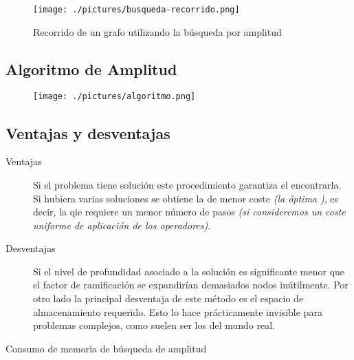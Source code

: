 \documentclass[letterpaper,12pt]{article}
\begin{document}
  	\begin{figure}[!hbt]
  		\centering
  	  	\texttt{[image: ./pictures/busqueda-recorrido.png]}
	  	\caption{Recorrido de un grafo utilizando la b\'usqueda por amplitud}
	  	\label{tipo:busqueda}
		\end{figure}
	
	
	\subsection{Algoritmo de Amplitud }
	
  	\begin{figure}[!hbt]
  		\centering
  	  	\texttt{[image: ./pictures/algoritmo.png]}
		\end{figure}

	

	\subsection{ Ventajas y desventajas }	
	
	\begin{description}
		\item[Ventajas] Si el problema tiene soluci\'on este procedimiento garantiza el encontrarla. Si hubiera varias soluciones se obtiene la de menor coste \textit{(la \'optima )}, es decir, la qie requiere un menor n\'umero de pasos \textit{ (si consideremos un coste uniforme de aplicaci\'on de los operadores)}.
		
		\item[Desventajas] Si el nivel de profundidad asociado a la soluci\'on es significante menor que el factor de ramificaci\'on se expandir\'ian demasiados nodos in\'utilmente. Por otro lado la principal desventaja de este m\'etodo es el espacio de almacenamiento requerido. Esto lo hace pr\'acticamente invisible para problemas complejos, como suelen ser los del mundo real.\\		

\end{description}		

		Consumo de memoria de b\'usqueda de amplitud\\
\end{document}

